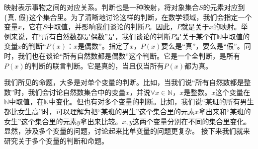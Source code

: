 \documentclass[12pt,UTF8,fontset=none]{ctexbook}
\begin{document}
映射表示事物之间的对应关系。判断也是一种映射，将对象集合$S$的元素对应到$\{\text{真},\,\text{假}\}$这个集合里。为了清晰地讨论这样的判断，在数学领域，我们会指定一个变量$x$，它在$S$中取值，并影响我们谈论的判断$P$。因此，$P$就是关于$x$的映射。举例来说，在“所有自然数都是偶数”是，我们谈论的判断$P$是关于某个在$\mathbb{N}$中取值的变量$x$的判断“$P(x)$：$x$是偶数”。指定了$x$，$P(x)$要么是“真”，要么是“假”。同时，我们也在谈论“所有自然数都是偶数”这个判断。它是一个全判断，是所有$P(x)$的判断的联言判断。它是真的，当且仅当所有$P(x)$都为真。

我们所见的命题，大多是对单个变量的判断。比如，当我们说“所有自然数都是整数”时，我们会讨论自然数集合中的变量$x$，并说$\forall x\in\mathbb{N}$，$x$是整数。$x$这个变量在$\mathbb{N}$中取值，在$\mathbb{N}$中变化。但也有对多个变量的判断。比如，我们说“某班的所有男生都比女生高”时，可以理解为把“某班的男生”这个集合里的元素$x$拿出来和“某班的女生”这个集合里的元素$y$拿出来比较。$x,y$这两个变量分别在不同的集合里变化。显然，涉及多个变量的问题，讨论起来比单变量的问题更复杂。
接下来我们就来研究关于多个变量的判断和命题。
\end{document}

